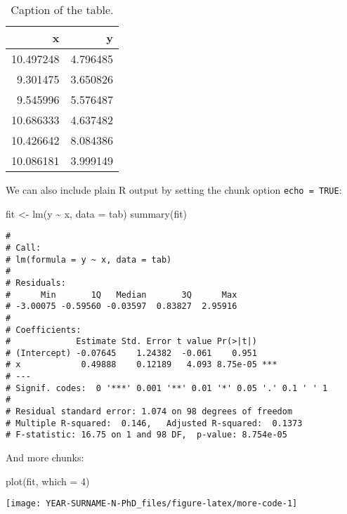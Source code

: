 \documentclass[
  12pt,
  oneside]{book}
\newenvironment{Shaded}{\begin{snugshade}}{\end{snugshade}}
\newcommand{\AttributeTok}[1]{\textcolor[rgb]{0.77,0.63,0.00}{#1}}
\newcommand{\DecValTok}[1]{\textcolor[rgb]{0.00,0.00,0.81}{#1}}
\newcommand{\FunctionTok}[1]{\textcolor[rgb]{0.00,0.00,0.00}{#1}}
\newcommand{\NormalTok}[1]{#1}
\newcommand{\OtherTok}[1]{\textcolor[rgb]{0.56,0.35,0.01}{#1}}
\newcommand{\SpecialCharTok}[1]{\textcolor[rgb]{0.00,0.00,0.00}{#1}}
\begin{document}
\begin{table}

\caption{\label{tab:table}Caption of the table.}
\centering
\begin{tabular}[t]{rr}
\toprule
x & y\\
\midrule
10.497248 & 4.796485\\
9.301475 & 3.650826\\
9.545996 & 5.576487\\
10.686333 & 4.637482\\
10.426642 & 8.084386\\
10.086181 & 3.999149\\
\bottomrule
\end{tabular}
\end{table}

We can also include plain R output by setting the chunk option \texttt{echo\ =\ TRUE}:

\begin{Shaded}
\begin{Highlighting}[]
\NormalTok{fit }\OtherTok{\textless{}{-}} \FunctionTok{lm}\NormalTok{(y }\SpecialCharTok{\textasciitilde{}}\NormalTok{ x, }\AttributeTok{data =}\NormalTok{ tab)}
\FunctionTok{summary}\NormalTok{(fit)}
\end{Highlighting}
\end{Shaded}

\begin{verbatim}
# 
# Call:
# lm(formula = y ~ x, data = tab)
# 
# Residuals:
#      Min       1Q   Median       3Q      Max 
# -3.00075 -0.59560 -0.03597  0.83827  2.95916 
# 
# Coefficients:
#             Estimate Std. Error t value Pr(>|t|)    
# (Intercept) -0.07645    1.24382  -0.061    0.951    
# x            0.49888    0.12189   4.093 8.75e-05 ***
# ---
# Signif. codes:  0 '***' 0.001 '**' 0.01 '*' 0.05 '.' 0.1 ' ' 1
# 
# Residual standard error: 1.074 on 98 degrees of freedom
# Multiple R-squared:  0.146,   Adjusted R-squared:  0.1373 
# F-statistic: 16.75 on 1 and 98 DF,  p-value: 8.754e-05
\end{verbatim}

And more chunks:

\begin{Shaded}
\begin{Highlighting}[]
\FunctionTok{plot}\NormalTok{(fit, }\AttributeTok{which =} \DecValTok{4}\NormalTok{)}
\end{Highlighting}
\end{Shaded}

\begin{center}\texttt{[image: YEAR-SURNAME-N-PhD\_files/figure-latex/more-code-1]} \end{center}
\end{document}
